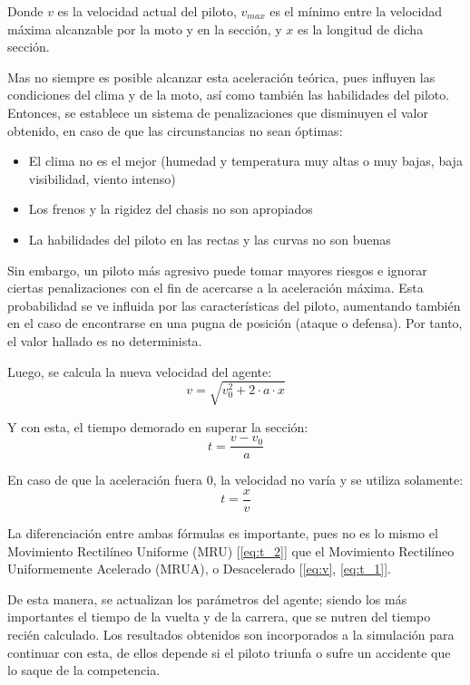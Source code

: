 \documentclass[12pt, letterpaper,spanish]{article}
\theoremstyle{definition}
\theoremstyle{remark}
\begin{document}
		Donde $v$ es la velocidad actual del piloto, $v_{max}$ es el mínimo entre la velocidad máxima alcanzable por la moto y en la sección, y $x$ es la longitud de dicha sección.

		Mas no siempre es posible alcanzar esta aceleración teórica, pues influyen las condiciones del clima y de la moto, así como también las habilidades del piloto. Entonces, se establece un sistema de penalizaciones que disminuyen el valor obtenido, en caso de que las circunstancias no sean óptimas:
		\begin{itemize}
			\item El clima no es el mejor (humedad y temperatura muy altas o muy bajas, baja visibilidad, viento intenso)
			\item Los frenos y la rigidez del chasis no son apropiados
			\item La habilidades del piloto en las rectas y las curvas no son buenas
		\end{itemize}

		Sin embargo, un piloto más agresivo puede tomar mayores riesgos e ignorar ciertas penalizaciones con el fin de acercarse a la aceleración máxima. Esta probabilidad se ve influida por las características del piloto, aumentando también en el caso de encontrarse en una pugna de posición (ataque o defensa). Por tanto, el valor hallado es no determinista.

		Luego, se calcula la nueva velocidad del agente:
		\begin{equation}\label{eq:v}
		v=\sqrt{v_{0}^{2} + 2 \cdot a \cdot x}
		\end{equation}

		Y con esta, el tiempo demorado en superar la sección:
		\begin{equation}\label{eq:t_1}
		t=\frac{v - v_{0}}{a}
		\end{equation}

		En caso de que la aceleración fuera $0$, la velocidad no varía y se utiliza solamente:
		\begin{equation}\label{eq:t_2}
		t=\frac{x}{v}
		\end{equation}

		La diferenciación entre ambas fórmulas es importante, pues no es lo mismo el Movimiento Rectilíneo Uniforme (MRU) [\ref{eq:t_2}] que el Movimiento Rectilíneo Uniformemente Acelerado (MRUA), o Desacelerado [\ref{eq:v}, \ref{eq:t_1}].

		De esta manera, se actualizan los parámetros del agente; siendo los más importantes el tiempo de la vuelta y de la carrera, que se nutren del tiempo recién calculado. Los resultados obtenidos son incorporados a la simulación para continuar con esta, de ellos depende si el piloto triunfa o sufre un accidente que lo saque de la competencia.
\end{document}
